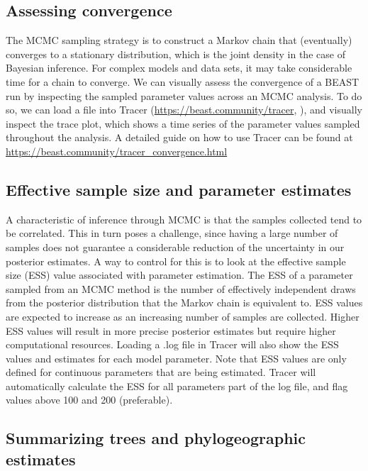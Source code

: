 \documentclass{article}
\newcommand{\code}[1]{
{\upshape\ttfamily{#1}}}
\begin{document}
\subsection*{Assessing convergence}

The MCMC sampling strategy is to construct a Markov chain that (eventually) converges to a stationary distribution, which is the joint density in the case of Bayesian inference.
For complex models and data sets, it may take considerable time for a chain to converge. We can visually assess the convergence of a BEAST run by inspecting the sampled parameter values across an MCMC analysis.
To do so, we can load a\code{.log} file into Tracer (\url{https://beast.community/tracer}, \cite{tracer}),
 and visually inspect the trace plot, which shows a time series of the parameter values sampled throughout the analysis.
A detailed guide on how to use Tracer can be found at \url{https://beast.community/tracer_convergence.html}

\subsection*{Effective sample size and parameter estimates}

A characteristic of inference through MCMC is that the samples collected tend to be correlated.
This in turn poses a challenge, since having a large number of samples does not guarantee a considerable reduction of the uncertainty in our posterior estimates.
A way to control for this is to look at the effective sample size (ESS) value associated with parameter estimation.
The ESS of a parameter sampled from an MCMC method is the number of effectively independent draws from the posterior distribution that the Markov chain is equivalent to.
ESS values are expected to increase as an increasing number of samples are collected.
Higher ESS values will result in more precise posterior estimates but require higher computational resources.
Loading a .log file in Tracer will also show the ESS values and estimates for each model parameter.
Note that ESS values are only defined for continuous parameters that are being estimated.
Tracer will automatically calculate the ESS for all parameters part of the log file, and flag values above 100 and 200 (preferable).

\subsection*{Summarizing trees and phylogeographic estimates}
\end{document}
